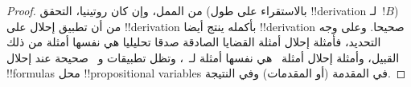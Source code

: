 \documentclass[../../../include/open-logic-section]{subfiles}
\begin{document}
\begin{proof}
  من الممل، وإن كان روتينيا، التحقق (بالاستقراء على طول
  !!{derivation} لـ~$!B$) من أن تطبيق إحلال على !!{derivation} بأكمله
  ينتج أيضا !!{derivation} صحيحا. وعلى وجه التحديد، فأمثلة إحلال
  أمثلة القضايا الصادقة صدقا تحليليا هي نفسها أمثلة من ذلك القبيل،
  وأمثلة إحلال أمثلة~ هي نفسها
  أمثلة لـ~، وتظل تطبيقات
  \MP{} و~\Nec{} صحيحة عند إحلال !!{formula}s محل
  !!{propositional variable}s في المقدمة (أو المقدمات) وفي النتيجة.
\end{proof}
\end{document}
